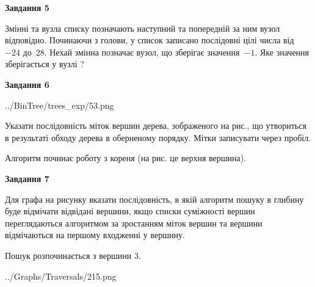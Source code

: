 \documentclass[12pt, ukrainian]{article}
\begin{document}
{\begin {large}
{\begin {center}\textbf{Завдання 5}\end {center}}\par
Змінні  та  вузла списку позначають наступний та попередній за ним вузол відповідно. Починаючи з голови, у список записано послідовні цілі числа від~$-24$ до~$28$. Нехай змінна  позначає вузол, що зберігає значення~$-1$.
Яке значення зберігається у вузлі  ?\par
\newpage

{\begin {center}\textbf{Завдання 6}\end {center}}\par

\begin{center}
	{../BinTree/trees_exp/53.png}
\end{center}
Указати послідовність міток вершин дерева, зображеного на рис., що утвориться в результаті обходу дерева в оберненому порядку. Мітки записувати через пробіл.\par Алгоритм починає роботу з кореня (на рис. це верхня вершина).\par
\newpage

{\begin {center}\textbf{Завдання 7}\end {center}}\par
Для графа на рисунку вказати послідовність, в якій алгоритм пошуку в глибину буде відмічати відвідані вершини, якщо списки суміжності вершин переглядаються алгоритмом за зростанням міток вершин та вершини відмічаються на першому вход\-женні у вершину.\par
Пошук розпочинається з вершини 3.\par

\begin{center}
	{../Graphs/Traversals/215.png}
\end{center}\par
\newpage


\end{large}}
\end{document}

